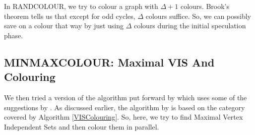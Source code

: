 \documentclass[MTech]{iitmdiss}
\begin{document}
In RANDCOLOUR, we try to colour a graph with $\Delta + 1$ colours. Brook's theorem \citep{Brooks1987} tells us that except for odd cycles, $\Delta$ colours suffice. So, we can possibly save on a colour that way by just using 
$\Delta$ colours during the initial speculation phase.

\subsection{MINMAXCOLOUR: Maximal VIS And Colouring}
We then tried a version of the algorithm put forward by \citet{Jones:1993:PGC:153109.153119} which uses some of the suggestions by \citet{cohenefficient}. As discussed earlier, the algorithm by \citet{Jones:1993:PGC:153109.153119} is based on the category covered by Algorithm \ref{VISColouring}. So, here, we try to find Maximal Vertex Independent Sets and then colour them in parallel. 
\end{document}

